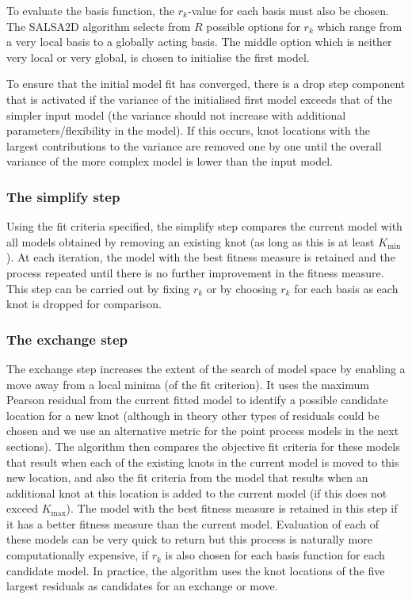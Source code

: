 \documentclass[letterpaper]{interact}
\begin{document}
To evaluate the basis function, the \(r_k\)-value for each basis must also be chosen. The SALSA2D algorithm selects from \(R\) possible options for \(r_k\) which range from a very local basis to a globally acting basis. The middle option which is neither very local or very global, is chosen to initialise the first model.

To ensure that the initial model fit has converged, there is a drop step component that is activated if the variance of the initialised first model exceeds that of the simpler input model (the variance should not increase with additional parameters/flexibility in the model). If this occurs, knot locations with the largest contributions to the variance are removed one by one until the overall variance of the more complex model is lower than the input model.  


\subsubsection{The simplify step}\label{the-simplify-step}

Using the fit criteria specified, the simplify step compares the current model with all models obtained by removing an existing knot (as long as this is at least \(K_{\textrm{min}}\)). At each iteration, the model with the best fitness measure is retained and the process repeated until there is no further improvement in the fitness measure. This step can be carried out by fixing \(r_k\) or by choosing \(r_k\) for each basis as each knot is dropped for comparison.


\subsubsection{The exchange step}\label{the-exchange-step}

The exchange step increases the extent of the search of model space by enabling a move away from a local minima (of the fit criterion). It uses the maximum Pearson residual from the current fitted model to identify a possible candidate location for a new knot (although in theory other types of residuals could be chosen and we use an alternative metric for the point process models in the next sections). The algorithm then compares the objective fit criteria for these models that result when each of the existing knots in the current model is moved to this new location, and also the fit criteria from the model that results when an additional knot at this location is added to the current model (if this does not exceed \(K_{\textrm{max}}\)). The model with the best fitness measure is retained in this step if it has a better fitness measure than the current model. Evaluation of each of these models can be very quick to return but this process is naturally more computationally expensive, if \(r_k\) is also chosen for each basis function for each candidate model. In practice, the algorithm uses the knot locations of the five largest residuals as candidates for an exchange or move.
\end{document}
